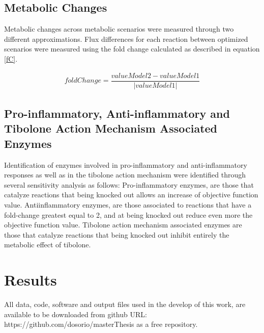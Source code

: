 \subsection*{Metabolic Changes}
Metabolic changes across metabolic scenarios were measured through two different approximations. Flux differences for each reaction between optimized scenarios were measured using the fold change calculated as described in equation \ref{fC}.
\begin{ceqn}
\begin{align}
\label{fC}
   foldChange = \dfrac{valueModel2-valueModel1}{\left|valueModel1\right|}
\end{align}
\end{ceqn}
\subsection*{Pro-inflammatory, Anti-inflammatory and Tibolone Action Mechanism Associated Enzymes}
Identification of enzymes involved in pro-inflammatory and anti-inflammatory responses as well as in the tibolone action mechanism were identified through several sensitivity analysis as follows: Pro-inflammatory enzymes, are those that catalyze reactions that being knocked out allows an increase of objective function value. Antiinflammatory enzymes, are those associated to reactions that have a fold-change greatest equal to 2, and at being knocked out reduce even more the objective function value. Tibolone action mechanism associated enzymes are those that catalyze reactions that being knocked out inhibit entirely the metabolic effect of tibolone.

\section{Results}
All data, code, software and output files used in the develop of this work, are available to be downloaded from github URL: https://github.com/dosorio/masterThesis as a free repository.

